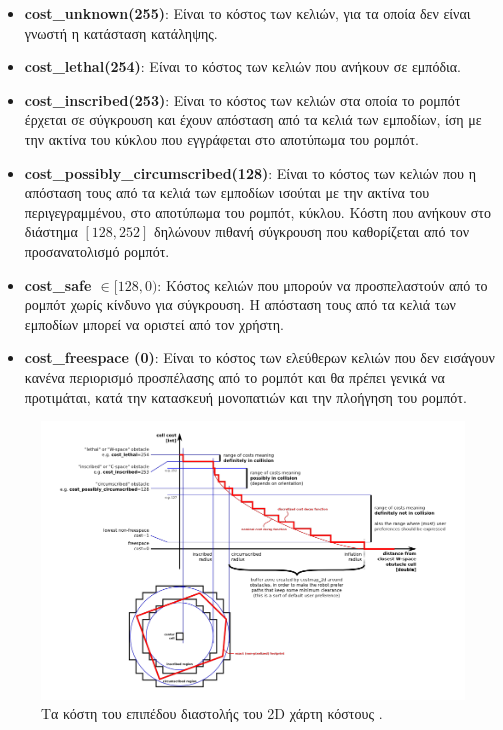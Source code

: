 \begin{itemize}
	\item \textbf{cost{\_}unknown(255)}: Είναι το κόστος των κελιών, για τα οποία δεν είναι γνωστή η κατάσταση κατάληψης.
	\item \textbf{cost{\_}lethal(254)}: Είναι το κόστος των κελιών που ανήκουν σε εμπόδια.
	\item \textbf{cost{\_}inscribed(253)}: Είναι το κόστος των κελιών στα οποία το ρομπότ έρχεται σε σύγκρουση και έχουν απόσταση από τα κελιά των εμποδίων, ίση με την ακτίνα του κύκλου που εγγράφεται στο αποτύπωμα του ρομπότ.
	\item \textbf{cost{\_}possibly{\_}circumscribed(128)}: Είναι το κόστος των κελιών που η απόσταση τους από τα κελιά των εμποδίων ισούται με την ακτίνα του περιγεγραμμένου, στο αποτύπωμα του ρομπότ, κύκλου. Κόστη που ανήκουν στο διάστημα $[128, 252]$ δηλώνουν πιθανή σύγκρουση που καθορίζεται από τον προσανατολισμό ρομπότ.
	\item \textbf{cost{\_}safe $\in [128,0)$}: Κόστος κελιών που μπορούν να προσπελαστούν από το ρομπότ χωρίς κίνδυνο για σύγκρουση. Η απόσταση τους από τα κελιά των εμποδίων μπορεί να οριστεί από τον χρήστη. 
	\item \textbf{cost{\_}freespace (0)}: Είναι το κόστος των ελεύθερων κελιών που δεν εισάγουν κανένα περιορισμό προσπέλασης από το ρομπότ και θα πρέπει γενικά να προτιμάται, κατά την κατασκευή μονοπατιών και την πλοήγηση του ρομπότ.
\end{itemize}

\begin{figure}[!ht]
	\centering
	\includegraphics[width=\linewidth]{Chapters/Chapter4/Figures/costmap_inflation_costs.png}
	\caption{Τα κόστη του επιπέδου διαστολής του 2D χάρτη κόστους \cite{costmap_2d}.}
	\label{fig:costmap_inflation_costs}
\end{figure}



